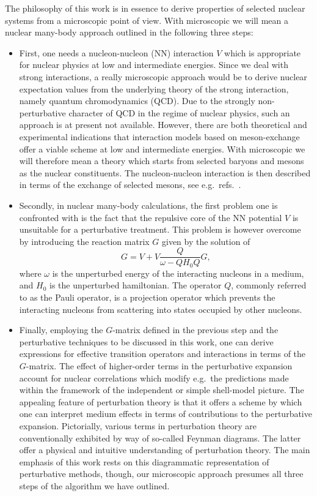 The philosophy of this work is in essence to derive properties
of selected nuclear systems from a microscopic point of view.
With microscopic we will mean a nuclear many-body approach outlined
in the following  three steps:
\begin{itemize}
\item First, one needs a nucleon-nucleon (NN) interaction $V$ which is
appropriate for nuclear physics at low and
intermediate energies.
Since we deal with strong interactions, a really
microscopic approach would be to derive nuclear expectation values
from the underlying theory of the strong interaction, namely
quantum chromodynamics (QCD). Due to the strongly
non-perturbative character of QCD in the regime of nuclear physics,
such an approach is at present not available. However, there are
both theoretical and experimental indications that interaction
models based on meson-exchange offer a viable scheme at low and
intermediate energies. With microscopic we will therefore
mean a theory which starts from selected baryons and mesons as the
nuclear constituents.
The nucleon-nucleon interaction is then described in terms of the
exchange of selected mesons,
see e.g.\ refs.\ \cite{mhe87,mac89,paris80,reid68}.
\item Secondly,
in nuclear many-body calculations, the first problem one is confronted
with is the fact
that the repulsive core of the NN potential $V$ is unsuitable for
a perturbative treatment. This problem is however overcome by
introducing the reaction matrix $G$ given by the solution
of 
\begin{equation}
G=V+V\frac{Q}{\omega - QH_0 Q}G,
\label{eq:gmat}
\end{equation}
where $\omega$ is the unperturbed energy of the interacting nucleons in
a medium, and $H_0$ is the unperturbed hamiltonian.
The operator $Q$,
commonly referred to as the Pauli operator, is a projection
operator which prevents the interacting nucleons from scattering into
states occupied by other nucleons.
\item Finally,
employing the $G$-matrix defined in the previous step and the
perturbative techniques to be discussed in this work, one
can derive expressions for effective transition operators and interactions
in terms of the
$G$-matrix. The effect of higher-order terms in the perturbative
expansion account for nuclear correlations which modify e.g.\ the
predictions made within the framework of the
independent or simple shell-model
picture. The appealing feature of perturbation theory is that it offers
a scheme by which one can interpret medium effects in terms of contributions
to the perturbative expansion. Pictorially, various terms in perturbation
theory  are conventionally exhibited by way of so-called Feynman diagrams.
The latter offer a physical and  intuitive understanding of perturbation
theory. The main emphasis of this work rests on this
diagrammatic representation of perturbative methods, though,
our
microscopic approach presumes all three steps of the algorithm we have
outlined.
\end{itemize}

